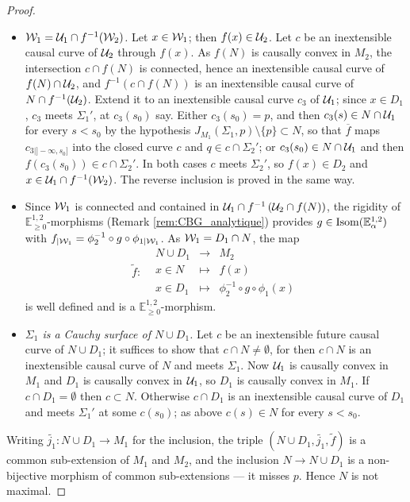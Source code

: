 \documentclass[a4paper,twoside]{article}
\newcommand{\fonctiondeux}[7]{\displaystyle#1:\begin{array}{l|rcl}
& \displaystyle #2 & \longrightarrow & \displaystyle #3 \\
    & \displaystyle #4 & \longmapsto & \displaystyle #5 \\
     & \displaystyle #6 & \longmapsto & \displaystyle #7\end{array}}
\newcommand{\mass}[1]{\mathbb{E}^{1,2}_{#1}}
\begin{document}
\begin{proof}
\begin{itemize}
\item \emph{$\mathcal W_1=\mathcal{U}_1\cap f^{-1}(\mathcal W_2)$.} Let $x\in \mathcal W_1$; then $f(x)\in \mathcal{U}_2$. Let $c$ be an
inextensible causal curve of $\mathcal{U}_2$ through $f(x)$. As $f(N)$ is causally convex in $M_2$, the
intersection $c\cap f(N)$ is connected, hence an inextensible causal curve of $f(N)\cap \mathcal{U}_2$, and
$f^{-1}(c\cap f(N))$ is an inextensible causal curve of $N\cap f^{-1}(\mathcal{U}_2)$. Extend it to an
inextensible causal curve $c_3$ of $\mathcal{U}_1$; since $x\in D_1$, $c_3$ meets $\Sigma_1'$, at $c_3(s_0)$
say. Either $c_3(s_0)=p$, and then $c_3(s)\in N\cap \mathcal{U}_1$ for every $s<s_0$ by the hypothesis
$J_{M_1}(\Sigma_1,p)\setminus\{p\}\subset N$, so that $\overline f$ maps $c_{3|]-\infty,s_0]}$ into
the closed curve $c$ and $q\in c\cap \Sigma_2'$; or $c_3(s_0)\in N\cap \mathcal{U}_1$ and then $f(c_3(s_0))\in
c\cap \Sigma_2'$. In both cases $c$ meets $\Sigma_2'$, so $f(x)\in D_2$ and $x\in
\mathcal{U}_1\cap f^{-1}(\mathcal W_2)$. The reverse inclusion is proved in the same way.

\item Since $\mathcal W_1$ is connected and contained in $\mathcal{U}_1\cap f^{-1}\left(\mathcal{U}_2\cap f(N)\right)$, the
rigidity of $\mass{\geq0}$-morphisms (Remark \ref{rem:CBG_analytique}) provides $g\in
\isom(\mass{\alpha})$ with $f_{|\mathcal W_1}=\phi_2^{-1}\circ g\circ \phi_{1|\mathcal W_1}$. As $\mathcal W_1=D_1\cap N$,
the map
$$\fonctiondeux{\widetilde f}{N\cup D_1}{M_2}{x \in N}{ f(x) }{x\in D_1}{\phi_2^{-1} \circ g \circ \phi_1(x)}$$
is well defined and is a $\mass{\geq0}$-morphism.

\item \emph{$\Sigma_1$ is a Cauchy surface of $N\cup D_1$.} Let $c$ be an inextensible future causal
curve of $N\cup D_1$; it suffices to show that $c\cap N\neq \emptyset$, for then $c\cap N$ is an
inextensible causal curve of $N$ and meets $\Sigma_1$. Now $\mathcal{U}_1$ is causally convex in $M_1$ and
$D_1$ is causally convex in $\mathcal{U}_1$, so $D_1$ is causally convex in $M_1$. If $c\cap D_1=\emptyset$
then $c\subset N$. Otherwise $c\cap D_1$ is an inextensible causal curve of $D_1$ and meets
$\Sigma_1'$ at some $c(s_0)$; as above $c(s)\in N$ for every $s<s_0$.
\end{itemize}

Writing $\widetilde{j_1}:N\cup D_1\rightarrow M_1$ for the inclusion, the triple $\left(N\cup
D_1,\widetilde{j_1},\widetilde f\right)$ is a common sub-extension of $M_1$ and $M_2$, and the
inclusion $N\rightarrow N\cup D_1$ is a non-bijective morphism of common sub-extensions --- it misses
$p$. Hence $N$ is not maximal.
\end{proof}
\end{document}
